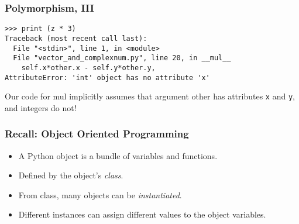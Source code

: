 \begin{frame}[fragile]\frametitle{Polymorphism, III}

\begin{lstlisting}
>>> print (z * 3)
Traceback (most recent call last):
  File "<stdin>", line 1, in <module>
  File "vector_and_complexnum.py", line 20, in __mul__
    self.x*other.x - self.y*other.y,
AttributeError: 'int' object has no attribute 'x'
\end{lstlisting}

  Our code for mul implicitly assumes
  that argument other has attributes \texttt{x} and
  \texttt{y}, and integers do not!
\end{frame}








\begin{frame}[fragile]\frametitle{Recall: Object Oriented Programming}

\begin{itemize}
\item A Python object is a bundle of variables and functions.
\item Defined  by the object's \emph{class}.
\item  From class, many objects can be \emph{instantiated}.
\item Different instances can assign different values to the object variables.
\end{itemize}
\end{frame}

